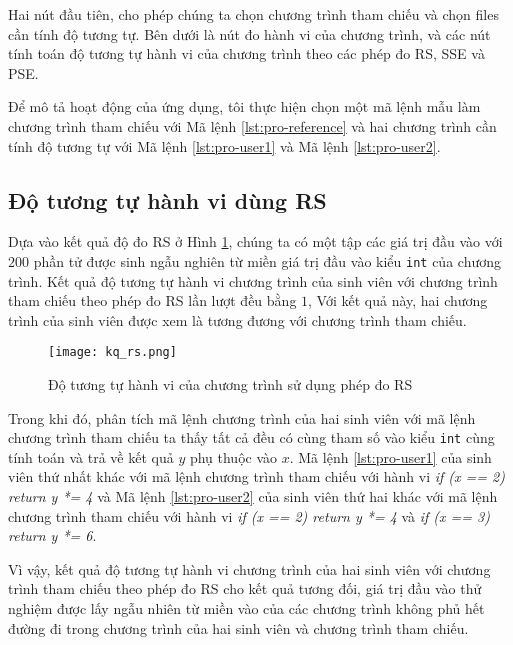 Hai nút đầu tiên, cho phép chúng ta chọn chương trình tham chiếu và chọn files cần 
tính độ tương tự. Bên dưới là nút đo hành vi của chương trình, và các nút tính 
toán độ tương tự hành vi của chương trình theo các phép đo RS, SSE và PSE.

Để mô tả hoạt động của ứng dụng, tôi thực hiện chọn một mã lệnh mẫu làm chương 
trình tham chiếu với Mã lệnh \ref{lst:pro-reference} và hai chương trình cần 
tính độ tương tự với Mã lệnh \ref{lst:pro-user1} và Mã lệnh \ref{lst:pro-user2}.






\subsection{Độ tương tự hành vi dùng RS}
Dựa vào kết quả độ đo RS ở Hình \ref{fig:result-RS}, chúng ta có một tập các 
giá trị đầu vào với $ 200 $ phần tử được sinh ngẫu nghiên từ miền giá trị đầu vào 
kiểu \texttt{int} của chương trình. Kết quả độ tương tự hành vi chương trình của 
sinh viên với chương trình tham chiếu theo phép đo RS lần lượt đều bằng $ 1 $, 
Với kết quả này, hai chương trình của sinh viên được xem là tương đương với 
chương trình tham chiếu. 

\begin{figure}[H]	
	\begin{center}
		\texttt{[image: kq\_rs.png]}
	\end{center}
	\caption{Độ tương tự hành vi của chương trình sử dụng phép đo RS}
	\label{fig:result-RS}
\end{figure}


Trong khi đó, phân tích mã lệnh chương trình của hai sinh viên với mã lệnh chương 
trình tham chiếu ta thấy tất cả đều có cùng tham số vào kiểu \texttt{int} cùng 
tính toán và trả về kết quả $ y $ phụ thuộc vào $ x $. Mã lệnh \ref{lst:pro-user1} 
của sinh viên thứ nhất khác với mã lệnh chương trình tham chiếu với hành vi 
\textit{if (x == 2) return y *= 4} và Mã lệnh \ref{lst:pro-user2} của sinh viên 
thứ hai khác với mã lệnh chương trình tham chiếu với hành vi 
\textit{if (x == 2) return y *= 4} và \textit{if (x == 3) return y *= 6}.

Vì vậy, kết quả độ tương tự hành vi chương trình của hai sinh viên với chương trình 
tham chiếu theo phép đo RS cho kết quả tương đối, giá trị đầu vào thử nghiệm được 
lấy ngẫu nhiên từ miền vào của các chương trình không phủ hết đường đi trong chương 
trình của hai sinh viên và chương trình tham chiếu.

